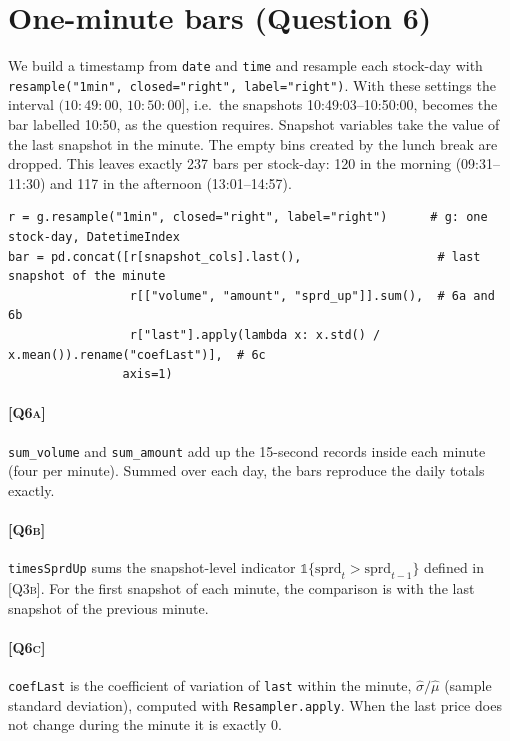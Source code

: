 \documentclass[11pt,a4paper]{article}
\newcommand{\Q}[1]{\textsc{[Q#1]}}
\newcommand{\code}[1]{\texttt{#1}}
\begin{document}
\section{One-minute bars (Question 6)}\label{sec:bars}

We build a timestamp from \code{date} and \code{time} and resample each stock-day with
\code{resample("1min", closed="right", label="right")}. With these settings the interval
$(10\!:\!49\!:\!00,\,10\!:\!50\!:\!00]$, i.e.\ the snapshots 10:49:03--10:50:00, becomes the bar
labelled 10:50, as the question requires. Snapshot variables take the value of the last snapshot in
the minute. The empty bins created by the lunch break are dropped. This leaves exactly 237 bars per
stock-day: 120 in the morning (09:31--11:30) and 117 in the afternoon (13:01--14:57).

\begin{lstlisting}
r = g.resample("1min", closed="right", label="right")      # g: one stock-day, DatetimeIndex
bar = pd.concat([r[snapshot_cols].last(),                   # last snapshot of the minute
                 r[["volume", "amount", "sprd_up"]].sum(),  # 6a and 6b
                 r["last"].apply(lambda x: x.std() / x.mean()).rename("coefLast")],  # 6c
                axis=1)
\end{lstlisting}

\paragraph{\Q{6a}} \code{sum\_volume} and \code{sum\_amount} add up the 15-second records inside
each minute (four per minute). Summed over each day, the bars reproduce the daily totals exactly.

\paragraph{\Q{6b}} \code{timesSprdUp} sums the snapshot-level indicator
$\mathbb{1}\{\text{sprd}_t>\text{sprd}_{t-1}\}$ defined in \Q{3b}. For the first snapshot of each
minute, the comparison is with the last snapshot of the previous minute.

\paragraph{\Q{6c}} \code{coefLast} is the coefficient of variation of \code{last} within the
minute, $\hat\sigma/\hat\mu$ (sample standard deviation), computed with \code{Resampler.apply}.
When the last price does not change during the minute it is exactly 0.
\end{document}
